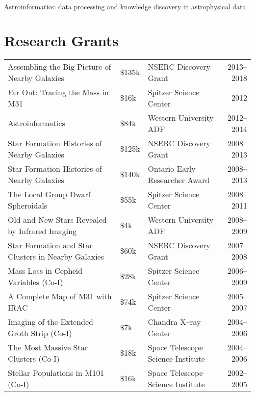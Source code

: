 \documentclass[12pt]{article}
\begin{document}
Astroinformatics: data processing and knowledge discovery in astrophysical data



\section{Research Grants}

\begin{tabularx}{\textwidth}{Xlp{5cm}r}

Assembling the Big Picture of Nearby Galaxies & \$135k & NSERC Discovery Grant & 2013--2018 \\ 

Far Out: Tracing the Mass in M31& \$16k& Spitzer Science Center & 2012\\ 

Astroinformatics & \$84k& Western University ADF& 2012--2014\\ 

 Star Formation Histories of Nearby Galaxies & \$125k& NSERC Discovery Grant & 2008--2013\\ 

Star Formation Histories of Nearby Galaxies & \$140k& Ontario Early Researcher Award& 2008--2013\\ 

 The Local Group Dwarf Spheroidals & \$55k& Spitzer Science Center & 2008--2011\\ 

Old and New Stars Revealed by Infrared Imaging & \$4k& Western University ADF  & 2008--2009\\

Star Formation and Star Clusters in Nearby Galaxies & \$60k& NSERC Discovery Grant&2007--2008\\  %

Mass Loss in Cepheid Variables (Co-I)& \$28k& Spitzer Science Center & 2006--2009\\ 

 A Complete Map of M31 with IRAC & \$74k& Spitzer Science Center & 2005--2007\\

Imaging of the Extended Groth Strip (Co-I)& \$7k& Chandra X--ray Center& 2004--2006\\ 

The Most Massive Star Clusters (Co-I)& \$18k & Space Telescope Science Institute& 2004--2006\\ 

Stellar Populations in M101 (Co-I)& \$16k & Space Telescope Science Institute& 2002--2005\\ 
\end{tabularx}
\end{document}
